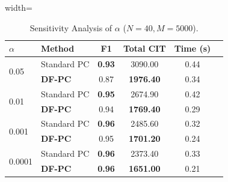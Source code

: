 \begin{table}[h!]\centering
\caption{Sensitivity Analysis of $\alpha$ ($N=40, M=5000$).}\label{table:alpha-sens}
\begin{adjustbox}{width=\columnwidth}\begin{tabular}{@{}llcccc@{}}\toprule
$\alpha$ & Method & F1 & Total CIT & Time (s) \\ \midrule
\multirow{2}{*}{0.05} & Standard PC & \textbf{0.93} & 3090.00 & 0.44 \\
 & \textbf{DF-PC} & 0.87 & \textbf{1976.40} & 0.34 \\
\midrule
\multirow{2}{*}{0.01} & Standard PC & \textbf{0.95} & 2674.90 & 0.42 \\
 & \textbf{DF-PC} & 0.94 & \textbf{1769.40} & 0.29 \\
\midrule
\multirow{2}{*}{0.001} & Standard PC & \textbf{0.96} & 2485.60 & 0.32 \\
 & \textbf{DF-PC} & 0.95 & \textbf{1701.20} & 0.24 \\
\midrule
\multirow{2}{*}{0.0001} & Standard PC & \textbf{0.96} & 2373.40 & 0.33 \\
 & \textbf{DF-PC} & \textbf{0.96} & \textbf{1651.00} & 0.21 \\
\bottomrule\end{tabular}\end{adjustbox}\end{table}

